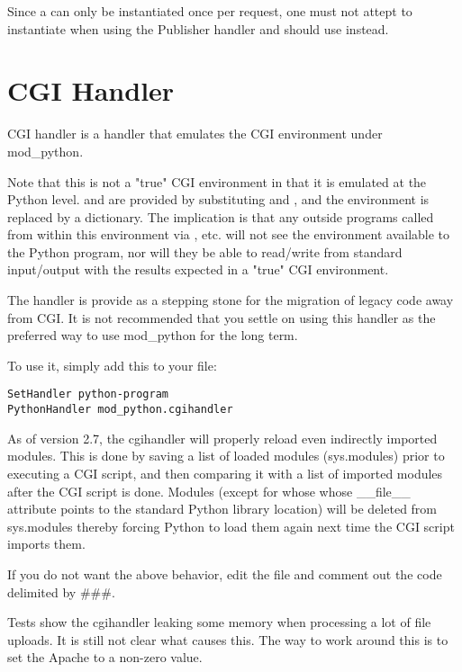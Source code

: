 Since a  can only be instantiated once per
request, one must not attept to instantiate  when
using the Publisher handler and should use
 instead.

\section{CGI Handler\label{hand-cgi}}


CGI handler is a handler that emulates the CGI environment under mod_python. 

Note that this is not a "true" CGI environment in that it is emulated
at the Python level.  and  are provided by
substituting  and , and the environment
is replaced by a dictionary. The implication is that any outside programs
called from within this environment via , etc. will
not see the environment available to the Python program, nor will they
be able to read/write from standard input/output with the results expected
in a "true" CGI environment.

The handler is provide as a stepping stone for the migration of legacy
code away from CGI. It is not recommended that you settle on using
this handler as the preferred way to use mod_python for the long term.

To use it, simply add this to your  file: 

\begin{verbatim}
SetHandler python-program
PythonHandler mod_python.cgihandler
\end{verbatim}

As of version 2.7, the cgihandler will properly reload even indirectly
imported modules. This is done by saving a list of loaded modules
(sys.modules) prior to executing a CGI script, and then comparing it
with a list of imported modules after the CGI script is done.  Modules
(except for whose whose __file__ attribute points to the standard
Python library location) will be deleted from sys.modules thereby
forcing Python to load them again next time the CGI script imports
them.

If you do not want the above behavior, edit the 
file and comment out the code delimited by \#\#\#.

Tests show the cgihandler leaking some memory when processing a lot of
file uploads. It is still not clear what causes this. The way to work
around this is to set the Apache  to a non-zero
value.

